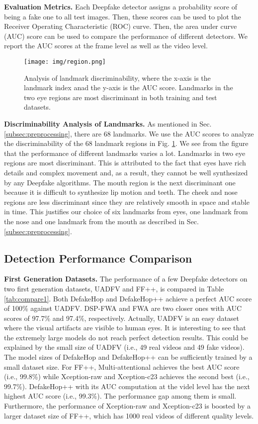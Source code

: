 \documentclass[main, biber]{now-journal}
\begin{document}
{\bf Evaluation Metrics.} Each Deepfake detector assigns a probability
score of being a fake one to all test images. Then, these scores can be
used to plot the Receiver Operating Characteristic (ROC) curve.  Then,
the area under curve (AUC) score can be used to compare the performance
of different detectors. We report the AUC scores at the frame level as
well as the video level. 

\begin{figure}[!t]
\centering
\texttt{[image: img/region.png]}
\caption{Analysis of landmark discriminability, where the x-axis is the
landmark index anad the y-axis is the AUC score. Landmarks in the two
eye regions are most discriminant in both training and test datasets.}
\label{fig_reg}
\end{figure}

{\bf Discriminability Analysis of Landmarks.} As mentioned in Sec.
\ref{subsec:preprocessing}, there are 68 landmarks. We use the AUC
scores to analyze the discriminability of the 68 landmark regions in
Fig.  \ref{fig_reg}. We see from the figure that the performance of
different landmarks varies a lot. Landmarks in two eye regions are most
discriminant. This is attributed to the fact that eyes have rich details
and complex movement and, as a result, they cannot be well synthesized
by any Deepfake algorithms. The mouth region is the next discriminant
one because it is difficult to synthesize lip motion and teeth. The
cheek and nose regions are less discriminant since they are relatively
smooth in space and stable in time.  This justifies our choice of six
landmarks from eyes, one landmark from the nose and one landmark from
the mouth as described in Sec.  \ref{subsec:preprocessing}. 

\subsection{Detection Performance Comparison}

{\bf First Generation Datasets.} The performance of a few Deepfake
detectors on two first generation datasets, UADFV and FF++, is compared
in Table \ref{tab:compare1}. Both DefakeHop and DefakeHop++ achieve a
perfect AUC score of 100\% against UADFV. DSP-FWA and FWA are two closer
ones with AUC scores of 97.7\% and 97.4\%, respectively. Actually, UADFV
is an easy dataset where the visual artifacts are visible to human eyes.
It is interesting to see that the extremely large models do not reach
perfect detection results. This could be explained by the small size of
UADFV (i.e., 49 real videos and 49 fake videos). The model sizes of
DefakeHop and DefakeHop++ can be sufficiently trained by a small dataset
size. For FF++, Multi-attentional achieves the best AUC score (i.e., 99.8\%)
while Xception-raw and Xception-c23 achieves the second best (i.e.,
99.7\%). DefakeHop++ with its AUC computation at the videl level has the
next highest AUC score (i.e., 99.3\%).  The performance gap among them
is small. Furthermore, the performance of Xception-raw and Xception-c23
is boosted by a larger dataset size of FF++, which has 1000 real videos
of different quality levels. 
\end{document}
